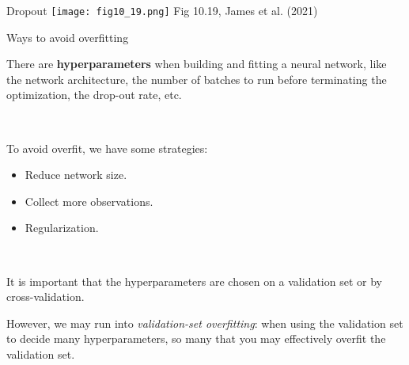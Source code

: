 \documentclass[
  10pt,
  ignorenonframetext,
]{beamer}
\begin{document}
\begin{frame}
\begin{block}{Dropout}
\protect\hypertarget{dropout-1}{}
\texttt{[image: fig10\_19.png]} \scriptsize Fig 10.19, James et al.
(2021)
\end{block}
\end{frame}

\begin{frame}
\begin{block}{Ways to avoid overfitting}
\protect\hypertarget{ways-to-avoid-overfitting}{}
\(~\)

There are \textbf{hyperparameters} when building and fitting a neural
network, like the network architecture, the number of batches to run
before terminating the optimization, the drop-out rate, etc.

\(~\)

To avoid overfit, we have some strategies:

\vspace{2mm}

\begin{itemize}
\item
  Reduce network size. \vspace{2mm}
\item
  Collect more observations. \vspace{2mm}
\item
  Regularization.
\end{itemize}

\(~\)

It is important that the hyperparameters are chosen on a validation set
or by cross-validation.

\vspace{2mm}

However, we may run into \emph{validation-set overfitting}: when using
the validation set to decide many hyperparameters, so many that you may
effectively overfit the validation set.
\end{block}
\end{frame}
\end{document}
